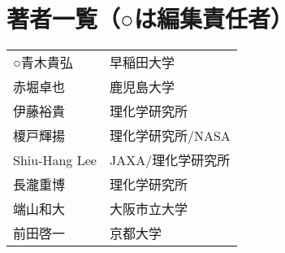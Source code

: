 \newpage
\section*{著者一覧（○は編集責任者）}
\begin{tabular}{ll}
\noalign{\smallskip}
○青木貴弘 & 早稲田大学 \\
赤堀卓也 & 鹿児島大学 \\
伊藤裕貴 & 理化学研究所 \\
榎戸輝揚 & 理化学研究所/NASA \\
Shiu-Hang Lee & JAXA/理化学研究所 \\
長瀧重博 & 理化学研究所 \\
端山和大 & 大阪市立大学 \\
前田啓一 & 京都大学 \\
\end{tabular}
